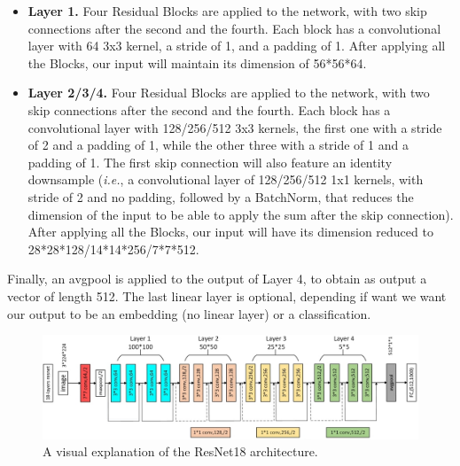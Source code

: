 \begin{itemize}
    \item \textbf{Layer 1.} Four Residual Blocks are applied to the network, with two skip connections after the second and the fourth. Each block has a convolutional layer with 64 3x3 kernel, a stride of 1, and a padding of 1. After applying all the Blocks, our input will maintain its dimension of 56*56*64.
    \item \textbf{Layer 2/3/4.} Four Residual Blocks are applied to the network, with two skip connections after the second and the fourth. Each block has a convolutional layer with 128/256/512 3x3 kernels, the first one with a stride of 2 and a padding of 1, while the other three with a stride of 1 and a padding of 1. The first skip connection will also feature an identity downsample (\textit{i.e.}, a convolutional layer of 128/256/512 1x1 kernels, with stride of 2 and no padding, followed by a BatchNorm, that reduces the dimension of the input to be able to apply the sum after the skip connection). After applying all the Blocks, our input will have its dimension reduced to 28*28*128/14*14*256/7*7*512.
\end{itemize}

\noindent Finally, an avgpool is applied to the output of Layer 4, to obtain as output a vector of length 512. The last linear layer is optional, depending if want we want our output to be an embedding (no linear layer) or a classification.

\begin{figure}[H]
    \centering
    \includegraphics[width=\linewidth]{Images/ResNet.png}
    \caption{A visual explanation of the ResNet18 architecture.}
    \label{fig:ResNet}
\end{figure}